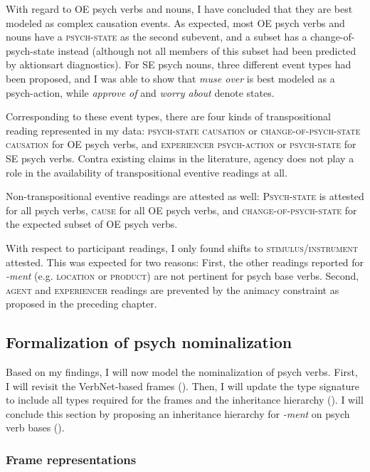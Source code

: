 With regard to OE psych verbs and nouns, I have concluded that they are best modeled as complex causation events. 
As expected, most OE psych verbs and nouns have a \textsc{psych-state} as the second subevent, and a subset has a change-of-psych-state instead (although not all members of this subset had been predicted by aktionsart diagnostics).
For SE psych nouns, three different event types had been proposed, and I was able to show that \textit{muse over} is best modeled as a psych-action, while \textit{approve of} and \textit{worry about} denote states. 

Corresponding to these event types, there are four kinds of transpositional reading represented in my data: \textsc{psych-state causation} or \textsc{change-of-psych-state causation} for OE psych verbs, and \textsc{experiencer psych-action} or \textsc{psych-state} for SE psych verbs. Contra existing claims in the literature, agency does not play a role in the availability of transpositional eventive readings at all.

Non-transpositional eventive readings are attested as well: \textsc{Psych-state} is attested for all psych verbs, \textsc{cause} for all OE psych verbs, and \textsc{change-of-psych-state} for the expected subset of OE psych verbs.

With respect to participant readings, I only found shifts to \textsc{stimulus/instrument} attested. This was expected for two reasons: First, the other readings reported for \textit{-ment} (e.g. \textsc{location} or \textsc{product}) are not pertinent for psych base verbs. Second, \textsc{agent} and \textsc{experiencer} readings are prevented by the animacy constraint as proposed in the preceding chapter.

\subsection{Formalization of psych nominalization}
\label{sec:psy-output-formal}

Based on my findings, I will now model the nominalization of psych verbs. 
First, I will revisit the VerbNet-based frames ().
Then, I will update the type signature to include all types required for the frames and the inheritance hierarchy ().
I will conclude this section by proposing an inheritance hierarchy for \textit{-ment} on psych verb bases ().

\subsubsection{Frame representations}
\label{sec:psy-output-formal-frames}

